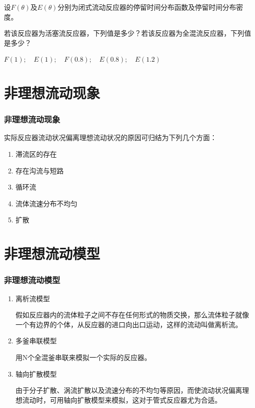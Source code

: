 \documentclass[dvipsnames, svgnames, x11names]{beamer}
\begin{document}
\begin{frame}[t]
    \frametitle{}

    \begin{example}
        设$F(\theta)$及$E(\theta)$分别为闭式流动反应器的停留时间分布函数及停留时间分布密度。

        若该反应器为活塞流反应器，下列值是多少？若该反应器为全混流反应器，下列值是多少？

        $F(1); \quad E(1); \quad F(0.8); \quad E(0.8); \quad E(1.2)$        

    \end{example}

\end{frame}


\section{非理想流动现象}


\begin{frame}
    \frametitle{非理想流动现象}

    实际反应器流动状况偏离理想流动状况的原因可归结为下列几个方面：
    \begin{enumerate}
        \item 滞流区的存在
        \item 存在沟流与短路
        \item 循环流
        \item 流体流速分布不均匀
        \item 扩散
    \end{enumerate}

\end{frame}


\section{非理想流动模型}


\begin{frame}
    \frametitle{非理想流动模型}

    \begin{enumerate}
        \item 离析流模型
        
        假如反应器内的流体粒子之间不存在任何形式的物质交换，那么流体粒子就像一个有边界的个体，从反应器的进口向出口运动，这样的流动叫做离析流。
        \item 多釜串联模型
        
        用N个全混釜串联来模拟一个实际的反应器。
        \item 轴向扩散模型
        
        由于分子扩散、涡流扩散以及流速分布的不均匀等原因，而使流动状况偏离理想流动时，可用轴向扩散模型来模拟，这对于管式反应器尤为合适。
    \end{enumerate}

\end{frame}
\end{document}
